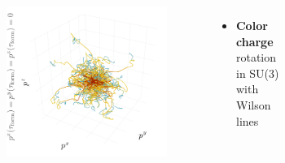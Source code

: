 \documentclass[aspectratio=169,11pt,usenames,dvipsnames]{beamer}
\begin{document}
\begin{frame}[noframenumbering]
\begin{columns}[onlytextwidth,t]
\begin{itemize}
            \end{itemize}
            \vspace{-20pt}
            \begin{figure}[!hbt]
                \centering
                \includegraphics[width=1.1\columnwidth]{images/wong_mom.png}
            \end{figure}
            \begin{itemize}\itemsep0em 
                \item \begin{center}\footnotesize {\bfseries Color charge} rotation in SU(3) with Wilson lines\end{center}
            \end{itemize}
            \vspace{-15pt}
            \begin{figure}[!hbt]
                \centering

\end{figure}
\end{columns}
\end{frame}
\end{document}

